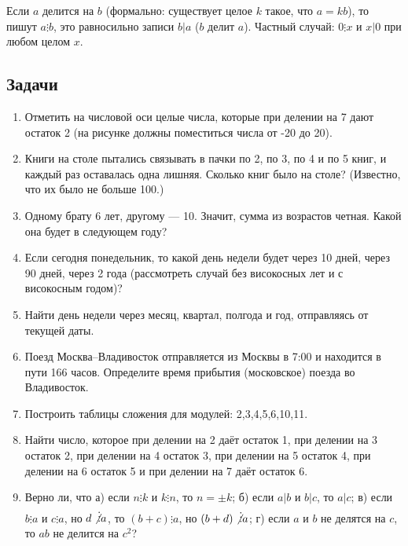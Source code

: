Если $a$ делится на $b$ (формально: существует целое $k$ такое, что $a=kb$), то пишут $a\vdots b$, это равносильно записи $b|a$ ($b$ делит $a$). Частный случай: $0\vdots x$ и $x|0$ при любом целом $x$.

\subsection*{Задачи}

\begin{enumerate}
\item Отметить на числовой оси целые числа, которые при делении на 7 дают остаток 2 (на рисунке должны поместиться числа от -20 до 20).
\item Книги на столе пытались связывать в пачки по 2, по 3, по 4 и по 5 книг, и каждый раз оставалась одна лишняя. Сколько книг было на столе? (Известно, что их было не больше 100.)
\item Одному брату 6 лет, другому --- 10. Значит, сумма из возрастов четная. Какой она будет в следующем году?
\item Если сегодня понедельник, то какой день недели будет через 10 дней, через 90 дней, через 2 года (рассмотреть случай без високосных лет и с високосным годом)?
\item Найти день недели через месяц, квартал, полгода и год, отправляясь от текущей даты.
\item Поезд Москва--Владивосток отправляется из Москвы в 7:00 и находится в пути 166 часов. Определите время прибытия (московское) поезда во Владивосток.
\item Построить таблицы сложения  для модулей: 2,3,4,5,6,10,11.
\item Найти число, которое при делении на 2 даёт остаток 1, при
делении на 3 остаток 2, при делении на 4 остаток 3, при делении
на 5 остаток 4, при делении на 6 остаток 5 и при делении на 7 даёт
остаток 6.

\item Верно ли, что а) если $n\vdots k$ и $k\vdots n$, то $n=\pm k$; б) если $a|b$ и $b|c$, то $a|c$; в) если $b\vdots a$ и $c\vdots a$, но $d\not\vdots a$, то $(b+c)\vdots a$, но $(b+d)\not\vdots a$; г) если $a$ и $b$ не делятся на $c$, то $ab$ не делится на $c^2$?

\end{enumerate}

